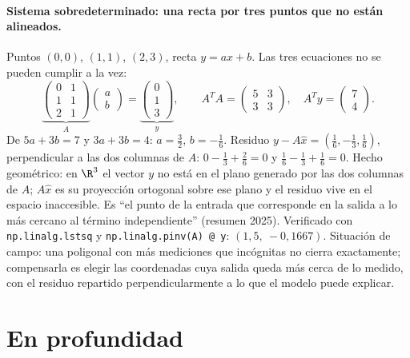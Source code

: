\paragraph{Sistema sobredeterminado: una recta por tres puntos que no están alineados.}
Puntos \((0,0)\), \((1,1)\), \((2,3)\), recta \(y=ax+b\). Las tres ecuaciones no se pueden
cumplir a la vez:
\[
  \underbrace{\begin{pmatrix}0&1\\1&1\\2&1\end{pmatrix}}_{A}
  \begin{pmatrix}a\\b\end{pmatrix}
  =\underbrace{\begin{pmatrix}0\\1\\3\end{pmatrix}}_{y},\qquad
  A^TA=\begin{pmatrix}5&3\\3&3\end{pmatrix},\quad A^Ty=\begin{pmatrix}7\\4\end{pmatrix}.
\]
De \(5a+3b=7\) y \(3a+3b=4\): \(a=\tfrac32\), \(b=-\tfrac16\). Residuo
\(y-A\hat x=(\tfrac16,-\tfrac13,\tfrac16)\), perpendicular a las dos columnas de \(A\):
\(0-\tfrac13+\tfrac26=0\) y \(\tfrac16-\tfrac13+\tfrac16=0\). Hecho geométrico: en
\(\R^3\) el vector \(y\) no está en el plano generado por las dos columnas de \(A\);
\(A\hat x\) es su proyección ortogonal sobre ese plano y el residuo vive en el espacio
inaccesible. Es ``el punto de la entrada que corresponde en la salida a lo más cercano al
término independiente'' (resumen 2025). Verificado con \texttt{np.linalg.lstsq} y
\texttt{np.linalg.pinv(A) @ y}: \((1{,}5,\ -0{,}1667)\). Situación de campo: una poligonal
con más mediciones que incógnitas no cierra exactamente; compensarla es elegir las
coordenadas cuya salida queda más cerca de lo medido, con el residuo repartido
perpendicularmente a lo que el modelo puede explicar.

\section{En profundidad}
